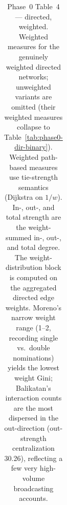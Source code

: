 \documentclass[11pt]{article}
\begin{document}
\begin{table}[!htbp]
\begin{tabular}{l r r | r r}
\bottomrule
\end{tabular}
\caption{Phase~0 Table~4 --- directed, weighted. Weighted measures for the genuinely weighted directed networks; unweighted variants are omitted (their weighted measures collapse to Table~\ref{tab:phase0-dir-binary}). Weighted path-based measures use tie-strength semantics (Dijkstra on $1/w$). In-, out-, and total strength are the weight-summed in-, out-, and total degree. The weight-distribution block is computed on the aggregated directed edge weights. Moreno's narrow weight range (1--2, recording single vs.\ double nominations) yields the lowest weight Gini; Balikatan's interaction counts are the most dispersed in the out-direction (out-strength centralization 30.26), reflecting a few very high-volume broadcasting accounts.}
\label{tab:phase0-dir-weighted}
\end{table}
\end{document}
